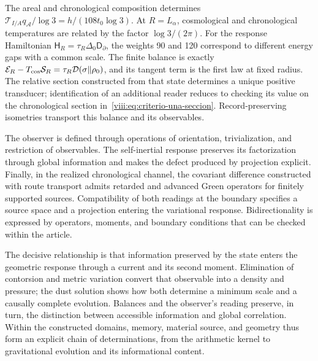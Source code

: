The areal and chronological composition determines
\(\mathcal T_{I/A}q_{\mathcal A}/\log3=h/(108t_0\log3)\).
At \(R=L_\alpha\), cosmological and chronological temperatures
are related by the factor \(\log3/(2\pi)\).
For the response Hamiltonian
\(\mathsf H_R=\tau_R\Delta_0\mathsf D_\partial\), the weights
90 and 120 correspond to different energy gaps with a common scale.
The finite balance is exactly
\(\mathcal E_R-T_{\rm cos}\mathcal S_R
=\tau_R\mathcal D(\sigma\Vert\rho_0)\), and its tangent term
is the first law at fixed radius. The relative section constructed from
that state determines a unique positive transducer; identification of
an additional reader reduces to checking its value on the chronological
section in~\eqref{viii:eq:criterio-una-seccion}. Record-preserving
isometries transport this balance and its observables.

The observer is defined through operations of orientation,
trivialization, and restriction of observables. The self-inertial
response preserves its factorization through global information
and makes the defect produced by projection explicit.
Finally, in the realized chronological channel, the covariant difference
constructed with route transport admits retarded and advanced
Green operators for finitely supported sources. Compatibility of both readings
at the boundary specifies a source space and a projection
entering the variational response. Bidirectionality
is expressed by operators, moments, and boundary conditions
that can be checked within the article.

The decisive relationship is that information preserved by the state
enters the geometric response through a current and its second moment.
Elimination of contorsion and metric variation convert that observable
into a density and pressure; the dust solution shows how both determine
a minimum scale and a causally complete evolution. Balances and the
observer's reading preserve, in turn, the distinction between accessible
information and global correlation. Within the constructed domains,
memory, material source, and geometry thus form an explicit chain of
determinations, from the arithmetic kernel to gravitational evolution
and its informational content.
